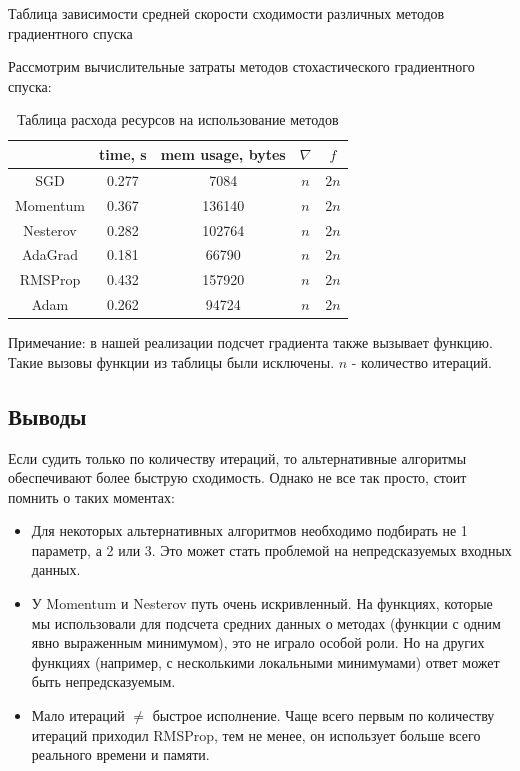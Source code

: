 \documentclass[a4paper,14pt,oneside,openany]{memoir}
\begin{document}
	\begin{table}[ht]\caption{Таблица зависимости средней скорости сходимости различных методов градиентного спуска}
	\end{table}
	
	Рассмотрим вычислительные затраты методов стохастического градиентного спуска:
	
	\begin{table}
	\centering
	\begin{tabular}{|c|c|c|c|c| }
	\hline
	& time, s & mem usage, bytes & $\nabla$ & $f$ \\
	\hline
	SGD & 0.277 & 7084 & $n$ & $2n$ \\
	\hline
	Momentum & 0.367 & 136140 & $n$ & $2n$ \\
	\hline
	Nesterov & 0.282 & 102764 & $n$ & $2n$ \\ 
	\hline
	AdaGrad & 0.181 & 66790 & $n$ & $2n$ \\
	\hline
	RMSProp & 0.432 & 157920 & $n$ & $2n$ \\
	\hline
	Adam & 0.262 & 94724 & $n$ & $2n$ \\
	\hline
	\end{tabular}
	\caption{Таблица расхода ресурсов на использование методов}
	Примечание: в нашей реализации подсчет градиента также вызывает функцию. Такие вызовы функции из таблицы были исключены. $n$ - количество итераций.
	\end{table}
		\newpage
		
	\subsection{Выводы}  
	Если судить только по количеству итераций, то альтернативные алгоритмы обеспечивают более быструю сходимость. Однако не все так просто, стоит помнить о таких моментах: 
	\begin{itemize} 
		\item Для некоторых альтернативных алгоритмов необходимо подбирать не 1 параметр, а 2 или 3. Это может стать проблемой на непредсказуемых входных данных. 
		\item У Momentum и Nesterov путь очень искривленный. На функциях, которые мы использовали для подсчета средних данных о методах (функции с одним явно выраженным минимумом), это не играло особой роли. Но на других функциях (например, с несколькими локальными минимумами) ответ может быть непредсказуемым.
		\item Мало итераций $\neq$ быстрое исполнение. Чаще всего первым по количеству итераций приходил RMSProp, тем не менее, он использует больше всего реального времени и памяти.
	\end{itemize}
	
\end{document}

